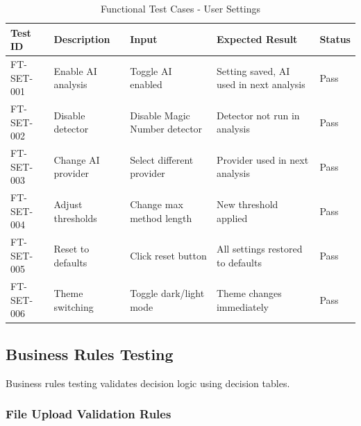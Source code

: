 \documentclass[12pt,a4paper]{article}
\begin{document}
    \begin{table}[H]
        \caption{Functional Test Cases - User Settings}
        \begin{tabular}{|p{2cm}|p{4cm}|p{3cm}|p{3cm}|p{1.5cm}|}
            \hline
            \textbf{Test ID} & \textbf{Description} & \textbf{Input} & \textbf{Expected Result} & \textbf{Status} \\
            \hline
            FT-SET-001 & Enable AI analysis & Toggle AI enabled & Setting saved, AI used in next analysis & Pass \\
            \hline
            FT-SET-002 & Disable detector & Disable Magic Number detector & Detector not run in analysis & Pass \\
            \hline
            FT-SET-003 & Change AI provider & Select different provider & Provider used in next analysis & Pass \\
            \hline
            FT-SET-004 & Adjust thresholds & Change max method length & New threshold applied & Pass \\
            \hline
            FT-SET-005 & Reset to defaults & Click reset button & All settings restored to defaults & Pass \\
            \hline
            FT-SET-006 & Theme switching & Toggle dark/light mode & Theme changes immediately & Pass \\
            \hline
        \end{tabular}
    \end{table}

    \subsection{Business Rules Testing}

    Business rules testing validates decision logic using decision tables.

    \subsubsection{File Upload Validation Rules}
\end{document}
